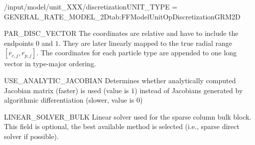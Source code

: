 \begin{condsubgroup}{/input/model/unit\_XXX/discretization}{UNIT\_TYPE = GENERAL\_RATE\_MODEL\_2D}{tab:FFModelUnitOpDiscretizationGRM2D}
\begin{dataset}[unit=--,type=double,range={$[0,1]$},length={$\sum_i (\texttt{NPAR}_i + 1)$}]{PAR\_DISC\_VECTOR}
    The coordinates are relative and have to include the endpoints $0$ and $1$.
    They are later linearly mapped to the true radial range $[r_{c,j}, r_{p,j}]$.
    The coordinates for each particle type are appended to one long vector in type-major ordering.
  \end{dataset}
  \begin{dataset}[type=int,range={$\{0, 1\}$},length=1]{USE\_ANALYTIC\_JACOBIAN}
    Determines whether analytically computed Jacobian matrix (faster) is used (value is $1$) instead of Jacobians generated by algorithmic differentiation (slower, value is $0$)
  \end{dataset}
  \begin{dataset}[type=string,range={$\{\texttt{DENSE},\texttt{UMFPACK},\texttt{SUPERLU}\}$},length={1}]{LINEAR\_SOLVER\_BULK}
    Linear solver used for the sparse column bulk block.
    This field is optional, the best available method is selected (i.e., sparse direct solver if possible).


\end{dataset}
\end{condsubgroup}
